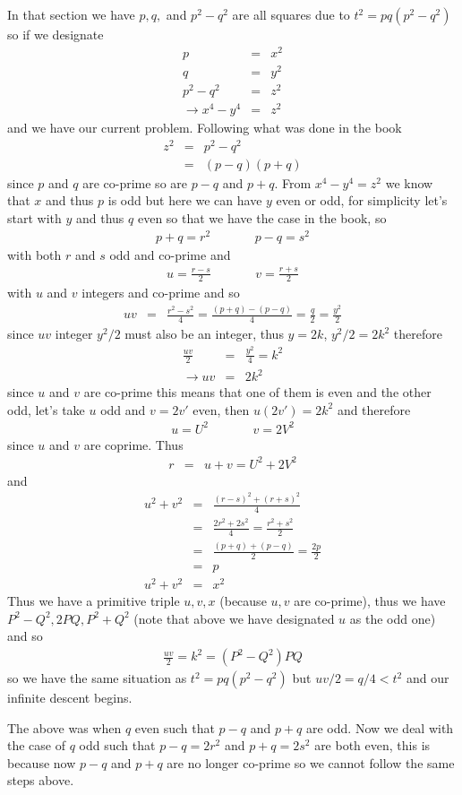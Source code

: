 \documentclass[aps,preprint,preprintnumbers,nofootinbib,showpacs,prd]{revtex4-1}
\newcommand{\nbea}{\begin{eqnarray*}}
\newcommand{\neea}{\end{eqnarray*}}
\begin{document}
In that section we have $p,q,$ and $p^2 - q^2$ are all squares due to $t^2 = pq(p^2-q^2)$ so if we designate
%
\nbea
p & = & x^2 \\
q & = & y^2 \\
p^2 - q^2 & = & z^2 \\
\to x^4 - y^4 & = & z^2
\neea
%
and we have our current problem. Following what was done in the book
%
\nbea
z^2 & = & p^2 - q^2 \\
& = & (p-q)(p+q)
\neea
%
since $p$ and $q$ are co-prime so are $p-q$ and $p+q$. From $x^4 - y^4 = z^2$ we know that $x$ and thus $p$ is odd but here we can have $y$ even or odd, for simplicity let's start with $y$ and thus $q$ even so that we have the case in the book, so
%
\nbea
p + q = r^2  ~~~~~~~~~~~~~~~~ p - q = s^2
\neea
%
with both $r$ and $s$ odd and co-prime and
%
\nbea
u = \frac{r - s}{2}   ~~~~~~~~~~~~~~~~ v = \frac{r + s}{2}
\neea
%
with $u$ and $v$ integers and co-prime and so
%
\nbea
uv & = & \frac{r^2 - s^2}{4} = \frac{(p+q)-(p-q)}{4} = \frac{q}{2} = \frac{y^2}{2}
\neea
%
since $uv$ integer $y^2/2$ must also be an integer, thus $y = 2k$, $y^2/2 = 2k^2$ therefore
%
\nbea
\frac{uv}{2} & = & \frac{y^2}{4} = k^2 \\
\to uv & = & 2k^2
\neea
%
since $u$ and $v$ are co-prime this means that one of them is even and the other odd, let's take $u$ odd and $v=2v'$ even, then $u(2v') = 2k^2$ and therefore
%
\nbea
u = U^2   ~~~~~~~~~~~~~~~~ v = 2 V^2
\neea
%
since $u$ and $v$ are coprime. Thus
%
\nbea
r & = & u + v = U^2 + 2V^2
\neea
%
and 
%
\nbea
u^2 + v^2 & = & \frac{(r-s)^2 + (r+s)^2}{4} \\
& = & \frac{2r^2 + 2s^2}{4} = \frac{r^2 + s^2}{2} \\
& = & \frac{(p+q) + (p-q)}{2} = \frac{2p}{2} \\
& = & p \\
u^2 + v^2 & = & x^2
\neea
%
Thus we have a primitive triple $u,v,x$ (because $u,v$ are co-prime), thus we have $P^2-Q^2,2PQ,P^2+Q^2$ (note that above we have designated $u$ as the odd one) and so
%
\nbea
\frac{uv}{2} = k^2 = (P^2 - Q^2)PQ
\neea
%
so we have the same situation as $t^2 = pq(p^2-q^2)$ but $uv/2 = q/4 < t^2$ and our infinite descent begins.

The above was when $q$ even such that $p-q$ and $p+q$ are odd. Now we deal with the case of $q$ odd such that $p-q = 2r^2$ and $p+q = 2s^2$ are both even, this is because now $p-q$ and $p+q$ are no longer co-prime so we cannot follow the same steps above.
\end{document}
